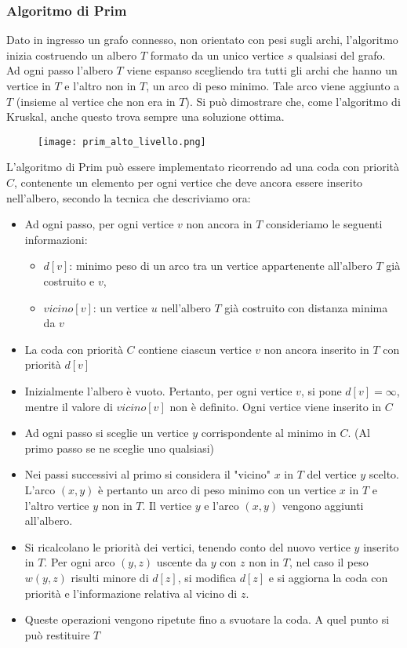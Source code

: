 \subsubsection{Algoritmo di Prim}
Dato in ingresso un grafo connesso, non orientato con pesi sugli archi, l'algoritmo inizia
costruendo un albero $T$ formato da un unico vertice $s$ qualsiasi del grafo.
Ad ogni passo l'albero $T$ viene espanso scegliendo tra tutti gli archi che hanno un vertice in $T$ e l'altro non in $T$, un arco
di peso minimo. Tale arco viene aggiunto a $T$ (insieme al vertice che non era in $T$). Si può dimostrare che, come l'algoritmo di 
Kruskal, anche questo trova sempre una soluzione ottima.\\
\begin{figure}[h]
    \texttt{[image: prim\_alto\_livello.png]}
\end{figure}
L'algoritmo di Prim può essere implementato ricorrendo ad una coda con priorità $C$, contenente 
un elemento per ogni vertice che deve ancora essere inserito nell'albero, secondo 
la tecnica che descriviamo ora:
\begin{itemize}
    \item Ad ogni passo, per ogni vertice $v$ non ancora in $T$ consideriamo le seguenti informazioni:
    \begin{itemize}
        \item $d[v]$: minimo peso di un arco tra un vertice appartenente all'albero $T$
        già costruito e $v$, 
        \item $vicino[v]$: un vertice $u$ nell'albero $T$ già costruito con distanza minima da $v$
    \end{itemize}
    \item La coda con priorità $C$ contiene ciascun vertice $v$ non ancora inserito in $T$ con priorità $d[v]$
    \item Inizialmente l'albero è vuoto. Pertanto, per ogni vertice $v$, si pone 
    $d[v] = \infty$, mentre il valore di $vicino[v]$ non è definito. Ogni vertice viene inserito in $C$
    \item Ad ogni passo si sceglie un vertice $y$ corrispondente al minimo in $C$. (Al primo passo se ne sceglie uno qualsiasi)
    \item Nei passi successivi al primo si considera il "vicino" $x$ in $T$ del vertice $y$ scelto.
    L'arco $(x,y)$ è pertanto un arco di peso minimo con un vertice $x$ in $T$ e l'altro vertice $y$ non in $T$.
    Il vertice $y$ e l'arco $(x,y)$ vengono aggiunti all'albero.
    \item Si ricalcolano le priorità dei vertici, tenendo conto del nuovo vertice $y$
    inserito in $T$. Per ogni arco $(y,z)$ uscente da $y$ con $z$ non in $T$, nel caso 
    il peso $w(y,z)$ risulti minore di $d[z]$, si modifica $d[z]$ e si aggiorna la coda con priorità e l'informazione relativa al vicino di $z$.
    \item Queste operazioni vengono ripetute fino a svuotare la coda. A quel punto si può restituire $T$
\end{itemize}
\clearpage

